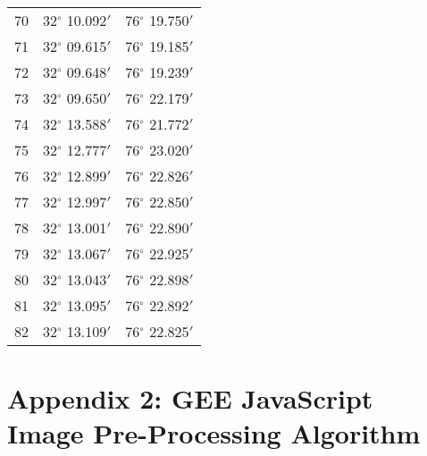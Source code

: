 \begin{ThreePartTable}
\begin{longtable}{L{2cm} L{6.3cm} L{6.3cm}}
70 & 32$^\circ$ 10.092$'$& 76$^\circ$ 19.750$'$\\
71 & 32$^\circ$ 09.615$'$& 76$^\circ$ 19.185$'$\\
72 & 32$^\circ$ 09.648$'$& 76$^\circ$ 19.239$'$\\
73 &  32$^\circ$ 09.650$'$& 76$^\circ$ 22.179$'$\\
74 & 32$^\circ$ 13.588$'$& 76$^\circ$ 21.772$'$\\
75 & 32$^\circ$ 12.777$'$& 76$^\circ$ 23.020$'$\\
76 &32$^\circ$ 12.899$'$& 76$^\circ$ 22.826$'$\\
77 &  32$^\circ$ 12.997$'$& 76$^\circ$ 22.850$'$\\
78 & 32$^\circ$ 13.001$'$& 76$^\circ$ 22.890$'$\\
79 &32$^\circ$ 13.067$'$& 76$^\circ$ 22.925$'$\\
80 & 32$^\circ$ 13.043$'$& 76$^\circ$ 22.898$'$\\
81 & 32$^\circ$ 13.095$'$& 76$^\circ$ 22.892$'$\\
82 &32$^\circ$ 13.109$'$& 76$^\circ$ 22.825$'$\\
		\bottomrule[0.25mm]
	\end{longtable}
\end{ThreePartTable}

\clearpage

\section{Appendix 2: GEE JavaScript Image Pre-Processing Algorithm}\label{app1}

